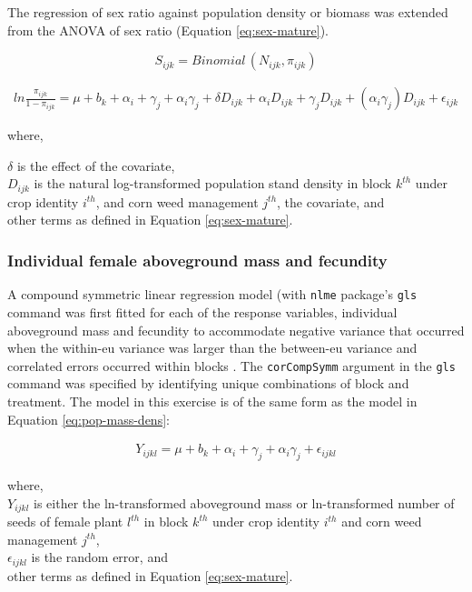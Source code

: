 \documentclass[
]{article}
\begin{document}
The regression of sex ratio against population density or biomass was extended from the ANOVA of sex ratio (Equation \eqref{eq:sex-mature}).

\[ S_{ijk} = Binomial\,(N_{ijk},\pi_{ijk}) \]

\begin{align}
ln \frac{\pi_{ijk}}{1-\pi_{ijk}} = \mu + b_k + \alpha_i + \gamma_j +\alpha_i \gamma_j + \delta D_{ijk}  + \alpha_i D_{ijk} + \gamma_j D_{ijk} + (\alpha_i \gamma_j)D_{ijk} + \epsilon_{ijk} \label{eq:sex-mature-anc}
\end{align}

where,

\(\delta\) is the effect of the covariate,\\
\(D_{ijk}\) is the natural log-transformed population stand density in block \(k^{th}\) under crop identity \(i^{th}\), and corn weed management \(j^{th}\), the covariate, and\\
other terms as defined in Equation \eqref{eq:sex-mature}.

\hypertarget{individual-female-aboveground-mass-and-fecundity-1}{%
\subsubsection*{Individual female aboveground mass and fecundity}\label{individual-female-aboveground-mass-and-fecundity-1}}

A compound symmetric linear regression model (with \texttt{nlme} package's \texttt{gls} command was first fitted for each of the response variables, individual aboveground mass and fecundity to accommodate negative variance that occurred when the within-eu variance was larger than the between-eu variance and correlated errors occurred within blocks \citep[version 3.1-153,][]{pinheroNlmeLinearNonlinear2021}.
The \texttt{corCompSymm} argument in the \texttt{gls} command was specified by identifying unique combinations of block and treatment. The model in this exercise is of the same form as the model in Equation \eqref{eq:pop-mass-dens}:

\begin{align}
Y_{ijkl} = \mu + b_k + \alpha_i + \gamma_j +\alpha_i \gamma_j + \epsilon_{ijkl} \label{eq:indiv-mass-fecund}
\end{align}

where,\\
\(Y_{ijkl}\) is either the ln-transformed aboveground mass or ln-transformed number of seeds of female plant \(l^{th}\) in block \(k^{th}\) under crop identity \(i^{th}\) and corn weed management \(j^{th}\),\\
\(\epsilon_{ijkl}\) is the random error, and \\
other terms as defined in Equation \eqref{eq:sex-mature}.
\end{document}
